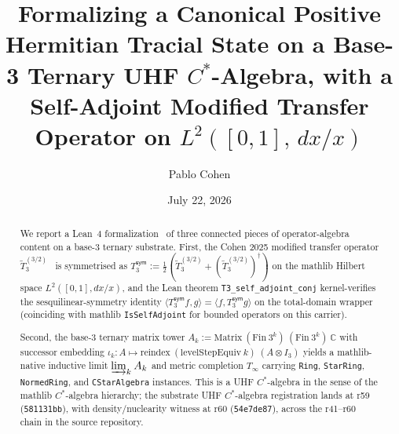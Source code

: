 \documentclass[11pt,a4paper]{amsart}
\title[Formalizing a UHF Tracial State on a Base-3 Ternary $C^*$-Algebra]{Formalizing a Canonical Positive Hermitian Tracial State on a Base-3 Ternary UHF $C^*$-Algebra, with a Self-Adjoint Modified Transfer Operator on $L^2([0,1],\, dx/x)$}
\author{Pablo Cohen}
\date{July 22, 2026}
\theoremstyle{plain}
\theoremstyle{definition}
\begin{document}
\maketitle

\begin{abstract}
\noindent We report a Lean~4 formalization~\cite{moura-ullrich2021,mathlib2020} of three connected pieces of operator-algebra content on a base-3 ternary substrate. First, the Cohen 2025 modified transfer operator $\widetilde{T}_3^{(3/2)}$~\cite{cohen2025transferOp} is symmetrised as $T_3^{\textsf{sym}} := \tfrac{1}{2}(\widetilde{T}_3^{(3/2)} + (\widetilde{T}_3^{(3/2)})^\dagger)$ on the mathlib Hilbert space $L^2([0,1], dx/x)$, and the Lean theorem \texttt{T3\_self\_adjoint\_conj} kernel-verifies the sesquilinear-symmetry identity $\langle T_3^{\textsf{sym}} f, g \rangle = \langle f, T_3^{\textsf{sym}} g \rangle$ on the total-domain wrapper (coinciding with mathlib \texttt{IsSelfAdjoint} for bounded operators on this carrier).

\smallskip

\noindent Second, the base-3 ternary matrix tower $A_k := \mathrm{Matrix}~(\mathrm{Fin}~3^k)~(\mathrm{Fin}~3^k)~\mathbb{C}$ with successor embedding $\iota_k \colon A \mapsto \mathrm{reindex}~(\mathrm{levelStepEquiv}~k)~(A \otimes I_3)$ yields a mathlib-native inductive limit $\varinjlim_k A_k$ and metric completion $T_\infty$ carrying \texttt{Ring}, \texttt{StarRing}, \texttt{NormedRing}, and \texttt{CStarAlgebra} instances. This is a UHF $C^*$-algebra in the sense of the mathlib $C^*$-algebra hierarchy; the substrate UHF $C^*$-algebra registration lands at r59 (\texttt{581131bb}), with density/nuclearity witness at r60 (\texttt{54e7de87}), across the r41--r60 chain in the source repository.

\smallskip


\end{abstract}
\end{document}
